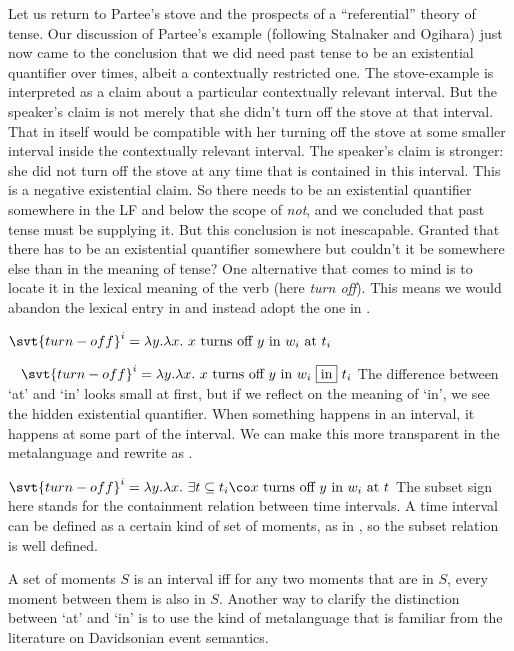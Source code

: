 Let us return to Partee's stove and the prospects of a ``referential'' theory of
tense. Our discussion of Partee's example (following Stalnaker and Ogihara) just
now came to the conclusion that we did need past tense to be an existential
quantifier over times, albeit a contextually restricted one. The stove-example
is interpreted as a claim about a particular contextually relevant interval. But
the speaker's claim is not merely that she didn't turn off the stove at that
interval. That in itself would be compatible with her turning off the stove at
some smaller interval inside the contextually relevant interval. The speaker's
claim is stronger: she did not turn off the stove at any time that is contained
in this interval. This is a negative existential claim. So there needs to be an
existential quantifier somewhere in the LF and below the scope of \emph{not},
and we concluded that past tense must be supplying it. But this conclusion is
not inescapable. Granted that there has to be an existential quantifier
somewhere \dash but couldn't it be somewhere else than in the meaning of tense?
One alternative that comes to mind is to locate it in the lexical meaning of the
verb (here \emph{turn off}). This means we would abandon the lexical entry in
\Next and instead adopt the one in \NNext.

\ex $\svt{turn-off}^{i} = \lambda y. \lambda x.\ x\ \text{turns
  off}\ y\ \text{in}\ w_{i}\ \text{at}\ t_{i}$ \label{ex:turnoff-at}\xe

\ex~ $\svt{turn-off}^{i} = \lambda y. \lambda x.\ x\ \text{turns
  off}\ y\ \text{in}\ w_{i}\ \boxed{\text{in}}\ t_{i}$\label{ex:turnoff-in} \xe
%
The difference between `at' and `in' looks small at first, but if we reflect on
the meaning of `in', we see the hidden existential quantifier. When something
happens in an interval, it happens at some part of the interval. We can make
this more transparent in the metalanguage and rewrite \Last as \Next.

\ex
$\svt{turn-off}^{i} = \lambda y. \lambda x.\ \exists t \subseteq t_{i}\co x\
\text{turns off}\ y\ \text{in}\ w_{i}\ \text{at}\ t$ \label{ex:turnoff-ex}\xe
%
The subset sign here stands for the containment relation between time intervals.
A time interval can be defined as a certain kind of set of moments, as in \Next,
so the subset relation is well defined.

\ex A set of moments $S$ is an interval iff for any two moments that are in $S$,
every moment between them is also in $S$.\xe
%
Another way to clarify the distinction between `at' and `in' is to use the kind
of metalanguage that is familiar from the literature on Davidsonian event
semantics.

